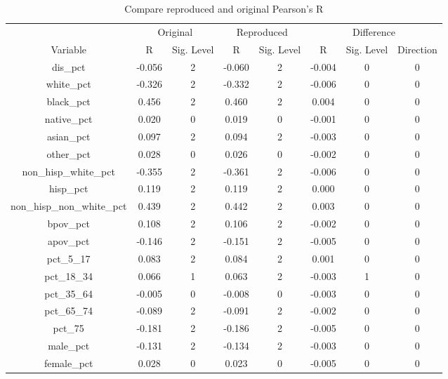 \documentclass[
]{article}
\begin{document}
\begin{table}

\caption{\label{tab:compare-pearsons-correlation}Compare reproduced and original Pearson's R}
\centering
\begin{tabular}[t]{c|c|c|c|c|c|c|c}
\hline
\multicolumn{1}{c|}{ } & \multicolumn{2}{c|}{Original} & \multicolumn{2}{c|}{Reproduced} & \multicolumn{3}{c}{Difference} \\
\cline{2-3} \cline{4-5} \cline{6-8}
Variable & R & Sig. Level & R & Sig. Level & R & Sig. Level & Direction\\
\hline
dis\_pct & -0.056 & 2 & -0.060 & 2 & -0.004 & 0 & 0\\
\hline
white\_pct & -0.326 & 2 & -0.332 & 2 & -0.006 & 0 & 0\\
\hline
black\_pct & 0.456 & 2 & 0.460 & 2 & 0.004 & 0 & 0\\
\hline
native\_pct & 0.020 & 0 & 0.019 & 0 & -0.001 & 0 & 0\\
\hline
asian\_pct & 0.097 & 2 & 0.094 & 2 & -0.003 & 0 & 0\\
\hline
other\_pct & 0.028 & 0 & 0.026 & 0 & -0.002 & 0 & 0\\
\hline
non\_hisp\_white\_pct & -0.355 & 2 & -0.361 & 2 & -0.006 & 0 & 0\\
\hline
hisp\_pct & 0.119 & 2 & 0.119 & 2 & 0.000 & 0 & 0\\
\hline
non\_hisp\_non\_white\_pct & 0.439 & 2 & 0.442 & 2 & 0.003 & 0 & 0\\
\hline
bpov\_pct & 0.108 & 2 & 0.106 & 2 & -0.002 & 0 & 0\\
\hline
apov\_pct & -0.146 & 2 & -0.151 & 2 & -0.005 & 0 & 0\\
\hline
pct\_5\_17 & 0.083 & 2 & 0.084 & 2 & 0.001 & 0 & 0\\
\hline
pct\_18\_34 & 0.066 & 1 & 0.063 & 2 & -0.003 & 1 & 0\\
\hline
pct\_35\_64 & -0.005 & 0 & -0.008 & 0 & -0.003 & 0 & 0\\
\hline
pct\_65\_74 & -0.089 & 2 & -0.091 & 2 & -0.002 & 0 & 0\\
\hline
pct\_75 & -0.181 & 2 & -0.186 & 2 & -0.005 & 0 & 0\\
\hline
male\_pct & -0.131 & 2 & -0.134 & 2 & -0.003 & 0 & 0\\
\hline
female\_pct & 0.028 & 0 & 0.023 & 0 & -0.005 & 0 & 0\\
\hline
\end{tabular}
\end{table}
\end{document}
